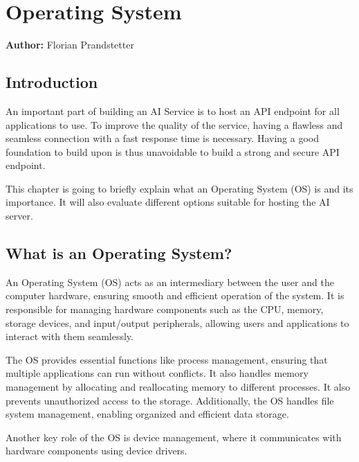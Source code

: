 \chapter{Operating System }
\label{chap:Operating_Systems_used}
\textbf{Author:} Florian Prandstetter

\author{Florian Prandstetter}

\section {Introduction}

An important part of building an AI Service is to host an API endpoint for all applications to use. To improve the quality of the service, having a flawless and seamless connection with a fast response time is necessary.
Having a good foundation to build upon is thus unavoidable to build a strong and secure API endpoint. 

This chapter is going to briefly explain what an Operating System (OS) is and its importance.
It will also evaluate different options suitable for hosting the AI server.

\section{What is an Operating System?}
\label{sec:WhatIsAnOs}

An Operating System (OS) acts as an intermediary between the user and the computer hardware, ensuring smooth and efficient operation of the system. It is responsible for managing hardware components such as the CPU, memory, storage devices, and input/output peripherals, allowing users and applications to interact with them seamlessly.

The OS provides essential functions like process management, ensuring that multiple applications can run without conflicts. It also handles memory management by allocating and reallocating memory to different processes. It also prevents unauthorized access to the storage.
Additionally, the OS handles file system management, enabling organized and efficient data storage. 

Another key role of the OS is device management, where it communicates with hardware components using device drivers.

